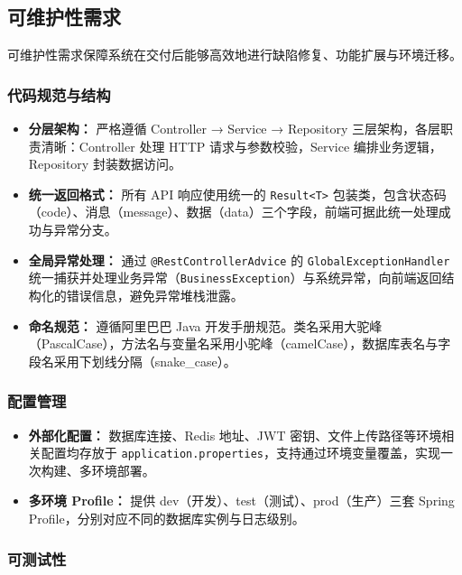\documentclass{../softeng}
\begin{document}
\subsection{可维护性需求}

可维护性需求保障系统在交付后能够高效地进行缺陷修复、功能扩展与环境迁移。

\subsubsection{代码规范与结构}

\begin{itemize}
    \item \textbf{分层架构：} 严格遵循 Controller → Service → Repository 三层架构，各层职责清晰：Controller 处理 HTTP 请求与参数校验，Service 编排业务逻辑，Repository 封装数据访问。
    \item \textbf{统一返回格式：} 所有 API 响应使用统一的 \texttt{Result<T>} 包装类，包含状态码（code）、消息（message）、数据（data）三个字段，前端可据此统一处理成功与异常分支。
    \item \textbf{全局异常处理：} 通过 \texttt{@RestControllerAdvice} 的 \texttt{GlobalExceptionHandler} 统一捕获并处理业务异常（\texttt{BusinessException}）与系统异常，向前端返回结构化的错误信息，避免异常堆栈泄露。
    \item \textbf{命名规范：} 遵循阿里巴巴 Java 开发手册规范。类名采用大驼峰（PascalCase），方法名与变量名采用小驼峰（camelCase），数据库表名与字段名采用下划线分隔（snake\_case）。
\end{itemize}

\subsubsection{配置管理}

\begin{itemize}
    \item \textbf{外部化配置：} 数据库连接、Redis 地址、JWT 密钥、文件上传路径等环境相关配置均存放于 \texttt{application.properties}，支持通过环境变量覆盖，实现一次构建、多环境部署。
    \item \textbf{多环境 Profile：} 提供 dev（开发）、test（测试）、prod（生产）三套 Spring Profile，分别对应不同的数据库实例与日志级别。
\end{itemize}

\subsubsection{可测试性}
\end{document}
